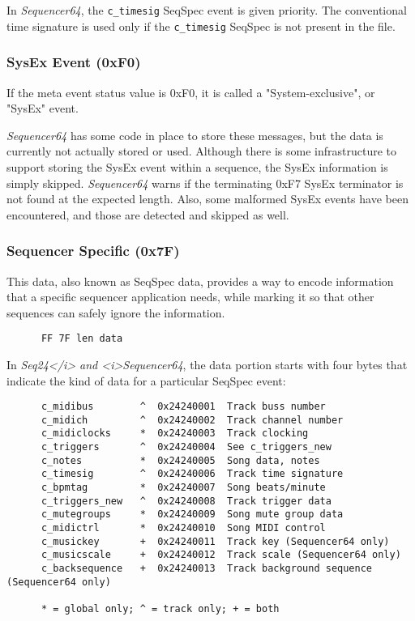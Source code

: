    In \textsl{Sequencer64},
   the \texttt{c\_timesig} SeqSpec event is given priority.  The
   conventional time signature is used only if the \texttt{c\_timesig}
   SeqSpec is not present in the file.

\subsubsection{SysEx Event (0xF0)}
\label{subsubsec:midi_format_meta_sysex_event}

   If the meta event status value is 0xF0, it is called a "System-exclusive",
   or "SysEx" event.

   \textsl{Sequencer64} has some code in place to store these messages, but the
   data is currently not actually stored or used.  Although there is some
   infrastructure to support storing the SysEx event within a sequence, the
   SysEx information is simply skipped.  \textsl{Sequencer64} warns if the
   terminating 0xF7 SysEx terminator is not found at the expected length.
   Also, some malformed SysEx events have been encountered, and those are
   detected and skipped as well.

\subsubsection{Sequencer Specific (0x7F)}
\label{subsubsec:midi_format_meta_sequencer_specific}

   This data, also known as SeqSpec data, provides a way to encode information
   that a specific sequencer application needs, while marking it so that other
   sequences can safely ignore the information.

   \begin{verbatim}
      FF 7F len data
   \end{verbatim}

   In \textsl{Seq24</i> and <i>Sequencer64},
   the data portion starts with four bytes
   that indicate the kind of data for a particular SeqSpec event:

   \begin{verbatim}
      c_midibus        ^  0x24240001  Track buss number
      c_midich         ^  0x24240002  Track channel number
      c_midiclocks     *  0x24240003  Track clocking
      c_triggers       ^  0x24240004  See c_triggers_new
      c_notes          *  0x24240005  Song data, notes
      c_timesig        ^  0x24240006  Track time signature
      c_bpmtag         *  0x24240007  Song beats/minute
      c_triggers_new   ^  0x24240008  Track trigger data
      c_mutegroups     *  0x24240009  Song mute group data
      c_midictrl       *  0x24240010  Song MIDI control
      c_musickey       +  0x24240011  Track key (Sequencer64 only)
      c_musicscale     +  0x24240012  Track scale (Sequencer64 only)
      c_backsequence   +  0x24240013  Track background sequence (Sequencer64 only)

      * = global only; ^ = track only; + = both
   \end{verbatim}

